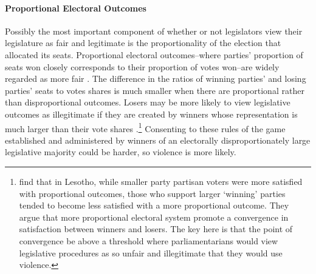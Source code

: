\documentclass[a4paper]{article}\usepackage{graphicx, color}
\begin{document}
\paragraph{Proportional Electoral Outcomes}

Possibly the most important component of whether or not legislators view their legislature as fair and legitimate is the proportionality of the election that allocated its seats. Proportional electoral outcomes--where parties' proportion of seats won closely corresponds to their proportion of votes won--are widely regarded as more fair \citep{norris1997}. The difference in the ratios of winning parties' and losing parties' seats to votes shares is much smaller when there are proportional rather than disproportional outcomes. Losers may be more likely to view legislative outcomes as illegitimate if they are created by winners whose representation is much larger than their vote shares \citep[see][]{lijphart1999}.\footnote{\cite{CHO2006} find that in Lesotho, while smaller party partisan voters were more satisfied with proportional outcomes, those who support larger `winning' parties tended to become less satisfied with a more proportional outcome. They argue that more proportional electoral system promote a convergence in satisfaction between winners and losers. The key here is that the point of convergence be above a threshold where parliamentarians would view legislative procedures as so unfair and illegitimate that they would use violence.} Consenting to these rules of the game established and administered by winners of an electorally disproportionately large legislative majority could be harder, so violence is more likely.
\end{document}
